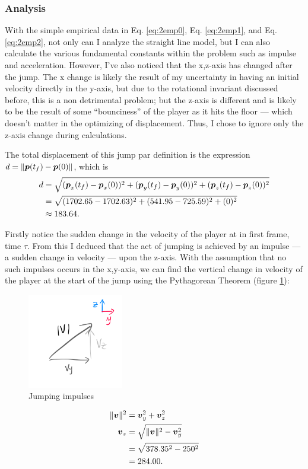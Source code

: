 \subsubsection{Analysis}
With the simple empirical data in Eq. \ref{eq:2emp0}, Eq. \ref{eq:2emp1}, and Eq. \ref{eq:2emp2}, not only can I analyze the straight line model, but I can also calculate the various fundamental constants within the problem such as impulse and acceleration. However, I've also noticed that the x,z-axis has changed after the jump. The x change is likely the result of my uncertainty in having an initial velocity directly in the y-axis, but due to the rotational invariant discussed before, this is a non detrimental problem; but the z-axis is different and is likely to be the result of some ``bounciness'' of the player as it hits the floor --- which doesn't matter in the optimizing of displacement. Thus, I chose to ignore only the z-axis change during calculations.

The total displacement of this jump par definition is the expression $d = \|\boldsymbol{p}(t_f) - \boldsymbol{p}(0)\|$, which is
\begin{align*}
    d &= \sqrt{(\boldsymbol{p}_x(t_f) - \boldsymbol{p}_x(0))^2 + (\boldsymbol{p}_y(t_f) - \boldsymbol{p}_y(0))^2 + (\boldsymbol{p}_z(t_f) - \boldsymbol{p}_z(0))^2}\\
    &= \sqrt{(1702.65-1702.63)^2 + (541.95-725.59)^2 + (0)^2}\\
    &\approx 183.64.
\end{align*}


Firstly notice the sudden change in the velocity of the player at in first frame, time $\tau$. From this I deduced that the act of jumping is achieved by an impulse --- a sudden change in velocity --- upon the z-axis. With the assumption that no such impulses occurs in the x,y-axis, we can find the vertical change in velocity of the player at the start of the jump using the Pythagorean Theorem (figure \ref{fig:2verticalimpulse}):
\begin{figure}
    \includegraphics[width=0.37\textwidth,right]{assets/2verticalimpulse.png}
    \caption{Jumping impulses}
    \label{fig:2verticalimpulse}
\end{figure}
\begin{align*}
    \|\boldsymbol{v}\|^2 &= \boldsymbol{v}_y^2 + \boldsymbol{v}_z^2\\
    \boldsymbol{v}_z &= \sqrt{\|\boldsymbol{v}\|^2 - \boldsymbol{v}_y^2}\\
    &= \sqrt{378.35^2 -250^2}\\
    &= 284.00.
\end{align*}

